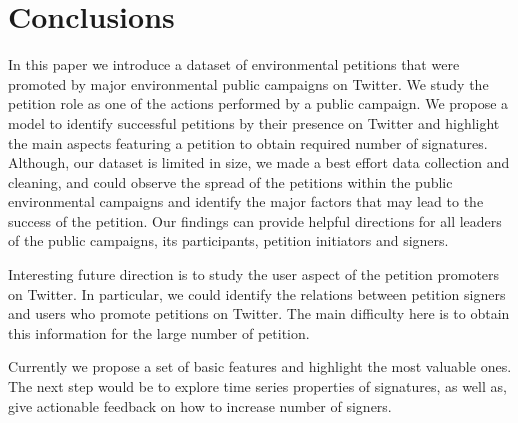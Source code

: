 \section{Conclusions}
In this paper we introduce a dataset of environmental petitions that were promoted by major environmental public campaigns on Twitter.
We study the petition role as one of the actions performed by a public campaign.
We propose a model to identify successful petitions by their presence on Twitter and highlight the main aspects featuring a petition to obtain required number of signatures.
Although, our dataset is limited in size, we made a best effort data collection and cleaning, and could observe the spread of the petitions within the public environmental campaigns and identify the major factors that may lead to the success of the petition.
Our findings can provide helpful directions for all leaders of the public campaigns, its participants, petition initiators and signers.

Interesting future direction is to study the user aspect of the petition promoters on Twitter. In particular, we could identify the relations between petition signers and users who promote petitions on Twitter. The main difficulty here is to obtain this information for the large number of petition.

Currently we propose a set of basic features and highlight the most valuable ones. The next step would be to explore time series properties of signatures, as well as, give actionable feedback on how to increase number of signers.